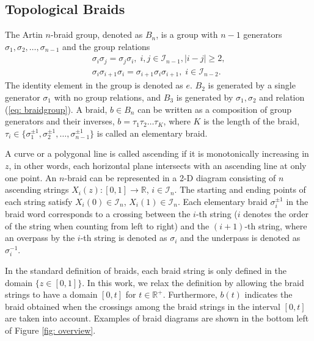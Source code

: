 \documentclass[conference]{IEEEtran}
\newcommand*{\myset}[1]{\mathcal{#1}} %
\newcommand*{\rone}{\mathbb{R}}
\newcommand*{\rpositive}{\mathbb{R}^+}
\newcommand*{\btau}{\tau} %
\newcommand*{\bgen}{\sigma} %
\newcommand*{\word}{b} %
\newcommand*{\totalnum}{K} %
\newcommand*{\identity}{e}
\newcommand*{\dummyc}{c}
\newcommand*{\braidgroup}{B}
\newcommand*{\stringx}{X}
\begin{document}

\subsection{Topological Braids}
The Artin $n$-braid group, denoted as $\braidgroup_n$, is a group with $n-1$ generators $\bgen_1, \bgen_2,\dots,\bgen_{n-1}$ and the group relations \cite{Kassel2008}
\begin{align}
    \bgen_i\bgen_j=\bgen_j\bgen_i, \; i,j\in\myset{I}_{n-1},|i-j|\geq2,\\
    \bgen_i\bgen_{i+1}\bgen_i=\bgen_{i+1}\bgen_{i}\bgen_{i+1},\;i\in\myset{I}_{n-2}.\label{eq: braidgroup}
\end{align}
The identity element in the group is denoted as $\identity$.
$\braidgroup_2$ is generated by a single generator $\bgen_1$ with no group relations, and $\braidgroup_3$ is generated by $\bgen_1, \bgen_2$ and relation (\ref{eq: braidgroup}).
A braid, $\word\in\braidgroup_n$ can be written as a composition of group generators and their inverses, $\word=\btau_1\btau_2\dots\btau_\totalnum$, where $\totalnum$ is the length of the braid, $\btau_i\in\{\bgen_1^{\pm1},\bgen_2^{\pm1},\dots,\bgen_{n-1}^{\pm1}\}$ is called an elementary braid.

A curve or a polygonal line is called ascending if it is monotonically increasing in $z$, in other words, each horizontal plane intersects with an ascending line at only one point.
An $n$-braid can be represented in a 2-D diagram consisting of $n$ ascending strings $\stringx_i(z):[0,1]\rightarrow\rone$, $i\in\myset{I}_n$.
The starting and ending points of each string satisfy $\stringx_i(0)\in\myset{I}_n$, $\stringx_i(1)\in\myset{I}_n$.
Each elementary braid $\bgen_i^{\pm1}$ in the braid word corresponds to a crossing between the $i$-th string ($i$ denotes the order of the string when counting from left to right) and the $(i+1)$-th string, where an overpass by the $i$-th string is denoted as $\bgen_i$ and the underpass is denoted as $\bgen_i^{-1}$.

In the standard definition of braids, each braid string is only defined in the domain $\{z\in[0,1]\}$.
In this work, we relax the definition by allowing the braid strings to have a domain $[0,t]$ for $t\in\rpositive$.
Furthermore, $\word(t)$ indicates the braid obtained when the crossings among the braid strings in the interval $[0,t]$ are taken into account.
Examples of braid diagrams are shown in the bottom left of Figure \ref{fig: overview}.
\end{document}
